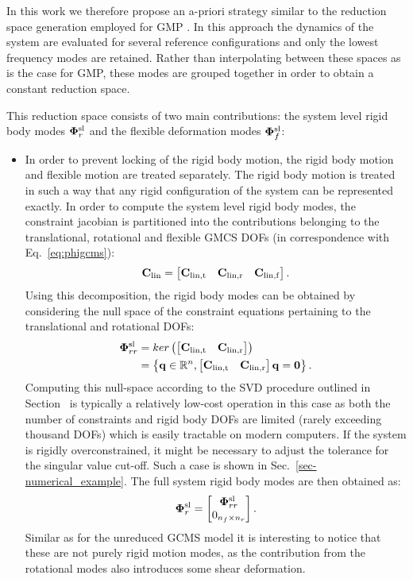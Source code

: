 In this work we therefore propose an a-priori strategy similar to the reduction space generation employed for GMP \cite{Bruls_IJNME2008}. In this approach the dynamics of the system are evaluated for several reference configurations and only the lowest frequency modes are retained. Rather than interpolating between these spaces as is the case for GMP, these modes are grouped together in order to obtain a constant reduction space. 

This reduction space consists of two main contributions: the system level rigid body modes $\bm \Phi^{\rm sl}_r$ and the flexible deformation modes $\bm \Phi^{\rm sl}_f$: 
\begin{itemize}
\item In order to prevent locking of the rigid body motion, the rigid body motion and flexible motion are treated separately. The rigid body motion is treated in such a way that any rigid configuration of the system can be represented exactly. 
In order to compute the system level rigid body modes, the constraint jacobian is partitioned into the contributions belonging to the translational, rotational and flexible GMCS DOFs (in correspondence with Eq.~\eqref{eq:phigcms}):
\begin{equation}
\mathbf C_{\rm lin} = \begin{bmatrix} \mathbf C_{\rm lin,t} & \mathbf C_{\rm lin,r} & \mathbf C_{\rm lin,f}\end{bmatrix}.
\end{equation}
Using this decomposition, the rigid body modes can be obtained by considering the null space of the constraint equations pertaining to the translational and rotational DOFs: 
\begin{eqnarray}
\bm \Phi^{\rm sl}_{rr} &= ker\left(\begin{bmatrix} \mathbf C_{\rm lin,t} & \mathbf C_{\rm lin,r}\end{bmatrix}\right) \\
& = \left\{\mathbf q \in \mathbb{R}^{n} , \begin{bmatrix} \mathbf C_{\rm lin,t} & \mathbf C_{\rm lin,r}\end{bmatrix}\mathbf q = \mathbf{0} \right\}.
\end{eqnarray}
Computing this null-space according to the SVD procedure outlined in Section~\label{sec:constraint_elimination} is typically a relatively low-cost operation in this case as both the number of constraints and rigid body DOFs are limited (rarely exceeding thousand DOFs) which is easily tractable on modern computers. If the system is rigidly overconstrained, it might be necessary to adjust the tolerance for the singular value cut-off. Such a case is shown in Sec.~\ref{sec-numerical_example}.
The full system rigid body modes are then obtained as:
\begin{equation}
\bm \Phi^{\rm sl}_r = \begin{bmatrix} \bm \Phi^{\rm sl}_{rr} \\ 0_{n_f\times n_r}\end{bmatrix}.
\end{equation}
Similar as for the unreduced GCMS model it is interesting to notice that these are not purely rigid motion modes, as the contribution from the rotational modes also introduces some shear deformation. 
 

\end{itemize}
